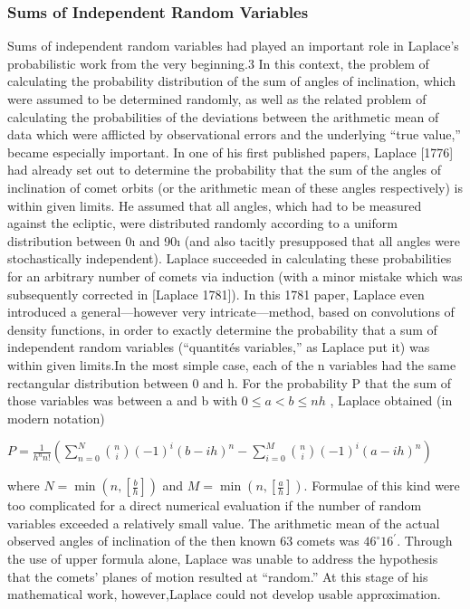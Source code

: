 \documentclass{article}
\begin{document}
\subsubsection{Sums of Independent Random Variables}
Sums of independent random variables had played an important role in Laplace’s
probabilistic work from the very beginning.3 In this context, the problem of calculating the probability distribution of the sum of angles of inclination, which were
assumed to be determined randomly, as well as the related problem of calculating
the probabilities of the deviations between the arithmetic mean of data which were
afflicted by observational errors and the underlying “true value,” became especially
important. In one of his first published papers, Laplace [1776] had already set out to
determine the probability that the sum of the angles of inclination of comet orbits (or
the arithmetic mean of these angles respectively) is within given limits. He assumed
that all angles, which had to be measured against the ecliptic, were distributed randomly according to a uniform distribution between 0ı and 90ı (and also tacitly
presupposed that all angles were stochastically independent). Laplace succeeded in
calculating these probabilities for an arbitrary number of comets via induction (with
a minor mistake which was subsequently corrected in [Laplace 1781]). In this 1781
paper, Laplace even introduced a general—however very intricate—method, based
on convolutions of density functions, in order to exactly determine the probability
that a sum of independent random variables (“quantités variables,” as Laplace put it)
was within given limits.In the most simple case, each of the n variables had the
same rectangular distribution between 0 and h. For the probability P that the sum
of those variables was between a and b with $ 0 \leq a< b \leq nh $ , Laplace obtained (in
modern notation)

$ P= \frac{1}{h^{n}n!}(\sum\limits_{n=0}^{N}\binom{n}{i}(-1)^{i}(b-ih)^{n}- \sum\limits_{i=0}^{M}\binom{n}{i}(-1)^{i}(a-ih)^{n}  ) $

where $ N= \min(n,[\frac{b}{h}]) $ and $ M= \min(n,[\frac{a}{h}])$.
Formulae of this kind were too complicated for a direct numerical evaluation if the number of random variables exceeded a relatively small value. The arithmetic mean of the actual observed angles of inclination of the then known 63 comets was $46^{\circ} 16^{\prime} $. Through the use of
upper formula  alone, Laplace was unable to address the hypothesis that the comets’ planes
of motion resulted at “random.” At this stage of his mathematical work, however,Laplace could not develop usable approximation.
\end{document}

